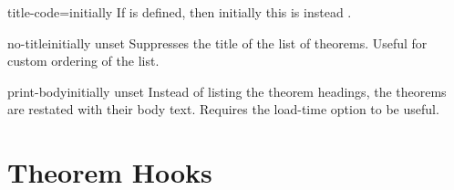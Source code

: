 \documentclass{ltxdoc}
\newcommand{\ttbraces}[1]{\braces{\texttt{#1}}}
\begin{document}
\begin{docKey}{title-code}{=}{initially \ttbraces{\#1}}
If  is defined, then initially this is instead \ttbraces{\#1}.
\end{docKey}

\begin{docKey}{no-title}{}{initially unset}
Suppresses the title of the list of theorems. Useful for custom ordering of the list.
\begin{keythmscode}[]
\listofkeytheorems[show=example]
\listofkeytheorems[show=solution,no-title]
\end{keythmscode}
\end{docKey}

\begin{docKey}{print-body}{}{initially unset}
Instead of listing the theorem headings, the theorems are restated with their body text. Requires the  load-time option to be useful.
\end{docKey}

\section{Theorem Hooks} \label{keythms-hooks}
\end{document}
